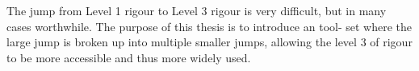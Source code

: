 The jump from Level 1 rigour to Level 3 rigour is very difficult, but in many
cases worthwhile. The purpose of this thesis is to introduce an tool- set where
the large jump is broken up into multiple smaller jumps, allowing the level 3 of
rigour to be more accessible and thus more widely used. 


%
%
%
%
